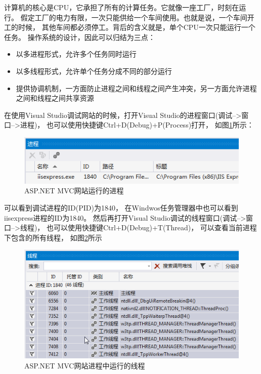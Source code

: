 \documentclass{book}
\begin{document}
计算机的核心是CPU，它承担了所有的计算任务。它就像一座工厂，时刻在运行。
假定工厂的电力有限，一次只能供给一个车间使用。也就是说，一个车间开工的时候，
其他车间都必须停工。背后的含义就是，单个CPU一次只能运行一个任务。
操作系统的设计，因此可以归结为三点：

\begin{itemize}
\item{以多进程形式，允许多个任务同时运行}
\item{以多线程形式，允许单个任务分成不同的部分运行}
\item{提供协调机制，一方面防止进程之间和线程之间产生冲突，另一方面允许进程之间和线程之间共享资源}
\end{itemize}

在使用Visual Studio调试网站的时候，打开Visual Studio的进程窗口(调试-->窗口-->进程)，
也可以使用快捷键Ctrl+D(Debug)+P(Process)打开，
如图\ref{fig:WebProcess}所示：

\begin{figure}[htbp]
	\centering
	\includegraphics[scale=0.8]{WebProcess.png}
	\caption{ASP.NET MVC网站运行的进程}
	\label{fig:WebProcess}
\end{figure}

可以看到调试进程的ID(PID)为1840，
在Windwos任务管理器中也可以看到iisexpress进程的ID为1840。
然后再打开Visual Studio调试的线程窗口(调试-->窗口-->线程)，
也可以使用快捷键Ctrl+D(Debug)+T(Thread)，
可以查看当前进程下包含的所有线程，
如图\ref{fig:IISDebuggingWebThread}所示

\begin{figure}[htbp]
	\centering
	\includegraphics[scale=0.8]{IISDebuggingWebThread.png}
	\caption{ASP.NET MVC网站进程中运行的线程}
	\label{fig:IISDebuggingWebThread}
\end{figure}
\end{document}
